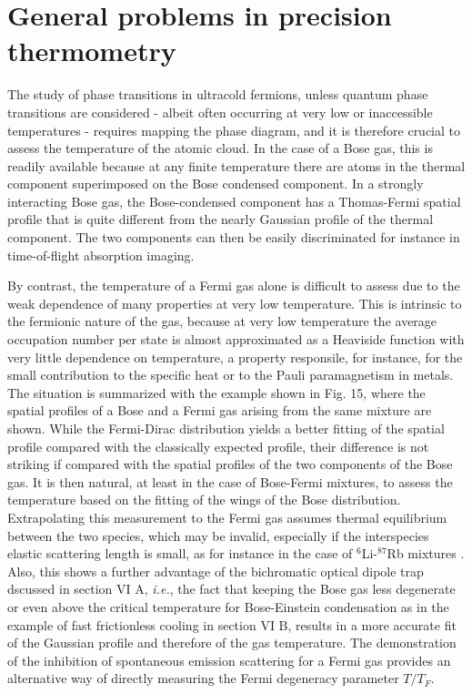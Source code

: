 \documentclass[pra,letterpaper,twocolumn,showpacs,superscriptaddress]{revtex4}
\begin{document}
\section{General problems in precision thermometry}

The study of phase transitions in ultracold fermions, unless quantum phase transitions are considered - albeit often occurring at very low or inaccessible 
temperatures - requires mapping the phase diagram, and it is therefore crucial to assess the temperature of the atomic cloud. In the case of a Bose gas, this is 
readily available because at any finite temperature there are atoms in the thermal component superimposed on the Bose condensed component.  
In a strongly interacting Bose gas, the Bose-condensed component has a Thomas-Fermi spatial profile that is quite different from the nearly 
Gaussian profile of the thermal component. The two components can then be easily discriminated for instance in time-of-flight absorption imaging. 

By contrast, the temperature of a Fermi gas alone is difficult to assess due to the weak dependence of many properties at very low temperature. 
This is intrinsic to the fermionic nature of the gas, because at very low temperature the average occupation number per state is almost approximated as a 
Heaviside function with very little dependence on temperature, a property responsile, for instance, for the small contribution to the specific heat or to 
the Pauli paramagnetism in metals. The situation is summarized with the example shown in Fig. 15, where the spatial profiles of a Bose and a Fermi gas 
arising from the same mixture are shown. While the Fermi-Dirac distribution yields a better fitting of the spatial profile compared with the classically expected 
profile, their difference is not striking if compared with the spatial profiles of the two components of the Bose gas. It is then natural, at least in the case of 
Bose-Fermi mixtures, to assess the temperature based on the fitting of the wings of the Bose distribution. Extrapolating this measurement to the Fermi gas 
assumes thermal equilibrium between the two species, which may be invalid, especially if the interspecies elastic scattering length is small, as for instance in the  
case of ${}^{6}$Li-${}^{87}$Rb mixtures \cite{Silber2005}. Also, this shows a further advantage of the bichromatic optical dipole trap dscussed in section VI A, 
{\it i.e.}, the fact that keeping the Bose gas less degenerate or even above the critical temperature for Bose-Einstein condensation as in the example 
of fast frictionless cooling in section VI B, results in a more accurate fit of the Gaussian profile and therefore of the gas temperature. 
The demonstration of the inhibition of spontaneous emission scattering for a Fermi gas 
\cite{Helmerson1990,Imamoglu1994,Javanainen1995,Busch1998,Gorlitz2001b,Shuve2010} provides an alternative way of directly measuring the Fermi degeneracy 
parameter $T/T_F$. 
\end{document}
